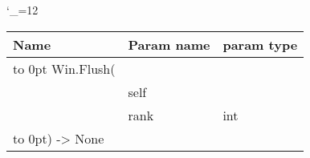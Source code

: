 \begingroup \catcode`\_=12 \tt
\begin{tabular}{lll}
\toprule
\textrm{Name}&\textrm{Param name}&\textrm{param type}\\
\midrule
\hbox to 0pt {Win.Flush(\hss}\\
& self\\
& rank & int\\
\hbox to 0pt{) -> None\hss}\\
\bottomrule
\end{tabular}
\endgroup
